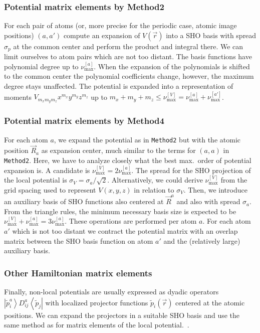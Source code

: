 \documentclass[oribibl]{llncs}
\newcommand{\um}[1]{_{\mathrm{#1}}}
\newcommand{\ttt}[1]{\texttt{#1}}
\newcommand{\ket}[1]{\left| #1 \right\rangle}
\newcommand{\bra}[1]{\left\langle #1 \right|}
\newcommand{\numax}{\nu\um{max}}
\begin{document}
\subsubsection{Potential matrix elements by Method2}
For each pair of atoms 
(or, more precise for the periodic case, atomic image positions)
$(a,a')$ compute an expansion of $V(\vec r)$ into a \ac{SHO} basis with spread $\sigma_p$
at the common center and perform the product and integral there.
We can limit ourselves to atom pairs which are not too distant.
The basis functions have polynomial degree up to $\numax^{[a]}$.
When the expansion of the polynomials is shifted to the common center
the polynomial coefficients change, however, the maximum degree stays unaffected.
The potential is expanded into a representation of moments $V_{m_x m_y m_z} x^{m_x} y^{m_y} z^{m_z}$ up to $m_x + m_y + m_z \leq \numax^{[V]} = \numax^{[a]} + \numax^{[a']}$.


\subsubsection{Potential matrix elements by Method4}
For each atom $a$, we expand the potential as in \ttt{Method2} but with the
atomic position $\vec R_a$ as expansion center, much similar to
the terms for $(a, a)$ in \ttt{Method2}.
Here, we have to analyze closely what the best max.~order of potential expansion is.
A candidate is $\numax^{[V]} = 2\numax^{[a]}$.
The spread for the \ac{SHO} projection of the local potential
is $\sigma_V = \sigma_a/\sqrt{2}$.
Alternatively, we could derive $\numax^{[V]}$ from the grid spacing used to represent $V(x,y,z)$ in relation to $\sigma_V$.
Then, we introduce an auxiliary basis of \ac{SHO} functions
also centered at $\vec R^a$ and also with spread $\sigma_a$.
From the triangle rules, the minimum necessary basis size
is expected to be $\numax^{[V]} + \numax^{[a]} = 3\numax^{[a]}$.
These operations are performed per atom $a$.
For each atom $a'$ which is not too distant
we contract the potential matrix with an overlap matrix between
the \ac{SHO} basis function on atom $a'$ and the (relatively large) auxiliary basis.


\subsubsection{Other Hamiltonian matrix elements}
Finally, non-local potentials are usually expressed as dyadic operators
$\ket{\tilde p^a_i} D^a_{ij} \bra{\tilde p_j}$ with localized projector functions $\tilde p_i(\vec r)$
centered at the atomic positions.
We can expand the projectors in a suitable \ac{SHO} basis and use the same method
as for matrix elements of the local potential.~\cite{BaumeisterTsukamotoPASC19}.
\end{document}
